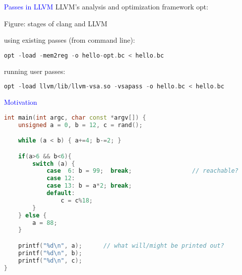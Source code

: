 \begin{frame}[fragile]{\textcolor{blue}{Passes in LLVM}}
LLVM's analysis and optimization framework {\color{blue} opt}:


\vspace{2cm}
\begin{center}
Figure: stages of clang and LLVM
\end{center}
\vspace{2cm}


using existing passes (from command line):
\begin{footnotesize}
\begin{lstlisting}[language=C++]
opt -load -mem2reg -o hello-opt.bc < hello.bc
\end{lstlisting}
\end{footnotesize}
running user passes:
\begin{footnotesize}
\begin{lstlisting}[language=C++]
opt -load llvm/lib/llvm-vsa.so -vsapass -o hello.bc < hello.bc
\end{lstlisting}
\end{footnotesize}

\end{frame}

\begin{frame}[fragile]{\textcolor{blue}{Motivation}}
\begin{footnotesize}
\begin{lstlisting}[language=C++]
int main(int argc, char const *argv[]) {
    unsigned a = 0, b = 12, c = rand();

    while (a < b) { a+=4; b-=2; }

    if(a>6 && b<6){
        switch (a) {
            case  6: b = 99;  break;                 // reachable?
            case 12:
            case 13: b = a*2; break;
            default:
                c = c%18;
        }
    } else {
        a = 88;
    }

    printf("%d\n", a);		// what will/might be printed out?
    printf("%d\n", b);
    printf("%d\n", c);
}
\end{lstlisting}
\end{footnotesize}
\end{frame}

